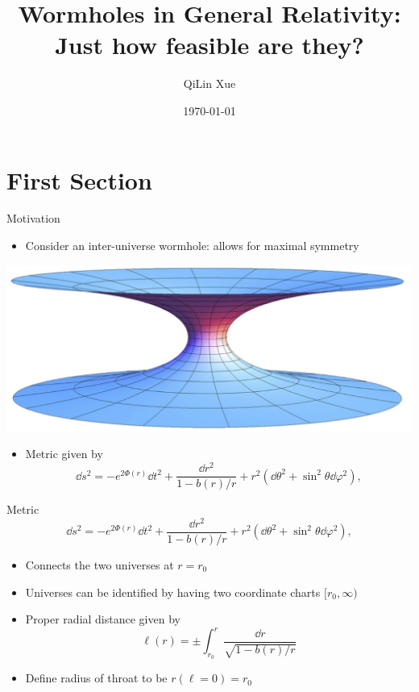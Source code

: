 \documentclass[aspectratio=169,xcolor=dvipsnames]{beamer}
\title[short title]{Wormholes in General Relativity: Just how feasible are they?}
\author{QiLin Xue}
\institute[UofT] %
{
    University of Toronto
    \vskip 3pt
}
\date{\today} %
\begin{document}
\begin{frame}
    \titlepage
\end{frame}
\section{First Section}

\begin{frame}{Motivation}
    \begin{itemize}
        \item Consider an inter-universe wormhole: allows for maximal symmetry
    \end{itemize}
    \begin{center}
        \includegraphics[width=0.6\linewidth]{figures/embedding.jpg}
    \end{center}
    \begin{itemize}
        \item Metric given by 
        \begin{equation}
            \dd{s}^2 = -e^{2\Phi(r)}\dd{t}^2 + \frac{\dd{r}^2}{1-b(r)/r} + r^2\left(\dd{\theta}^2 + \sin^2\theta\dd{\varphi}^2\right),
        \end{equation} 
    \end{itemize}
\end{frame}

\begin{frame}{Metric}
    \begin{equation*}
        \dd{s}^2 = -e^{2\Phi(r)}\dd{t}^2 + \frac{\dd{r}^2}{1-b(r)/r} + r^2\left(\dd{\theta}^2 + \sin^2\theta\dd{\varphi}^2\right),
    \end{equation*}
    \begin{itemize}
        \item Connects the two universes at $r=r_0$
        \item Universes can be identified by having two coordinate charts $[r_0,\infty)$ 
        \item Proper radial distance given by
        \begin{equation}
            \ell(r) = \pm \int_{r_0}^{r} \frac{\dd{r}}{\sqrt{1-b(r)/r}}
        \end{equation}
        \item Define radius of throat to be $r(\ell = 0)=r_0$
    \end{itemize} 
\end{frame}
\end{document}
